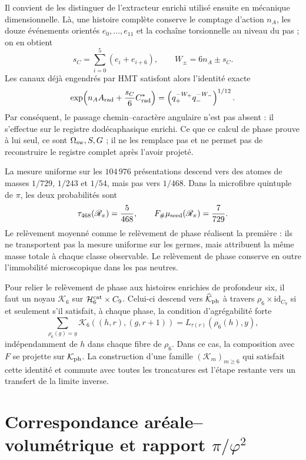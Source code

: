 Il convient de les distinguer de l'extracteur enrichi utilisé ensuite en
mécanique dimensionnelle. Là, une histoire complète conserve le comptage d'action
\(n_A\), les douze événements orientés \(e_0,\ldots,e_{11}\) et la cochaîne
torsionnelle au niveau du pas ; on en obtient
\[
 s_C=\sum_{i=0}^{5}(e_i+e_{i+6}),
 \qquad
 W_\pm=6n_A\pm s_C.
\]
Les canaux déjà engendrés par HMT satisfont alors l'identité exacte
\[
 \exp\!\left(n_AA_{\rm rad}+\frac{s_C}{6}C^\ast_{\rm rad}\right)
 =\left(q_+^{-W_+}q_-^{-W_-}\right)^{1/12}.
\]
Par conséquent, le passage chemin--caractère angulaire n'est pas absent : il s'effectue sur
le registre dodécaphasique enrichi. Ce que ce calcul de phase prouve à lui
seul, ce sont \(\Omega_{\rm sw},S,G\) ; il ne les remplace pas et ne permet pas de reconstruire le
registre complet après l'avoir projeté.

La mesure uniforme sur les \(104\,976\) présentations descend vers des atomes
de masses \(1/729\), \(1/243\) et \(1/54\), mais pas vers \(1/468\). Dans la
microfibre quintuple de \(\pi\), les deux probabilités sont
\[
 \tau_{468}(\mathscr R_\pi)=\frac5{468},
 \qquad
 F_\#\mu_{\rm seed}(\mathscr R_\pi)=\frac7{729}.
\]
Le relèvement moyenné comme le relèvement de phase réalisent la première : ils ne
transportent pas la mesure uniforme sur les germes, mais attribuent la même masse
totale à chaque classe observable. Le relèvement de phase conserve en outre
l'immobilité microscopique dans les pas neutres.

Pour relier le relèvement de phase aux histoires enrichies de
profondeur six, il faut un noyau \(\mathcal K_6\) sur
\(\mathcal H_6^{\rm cat}\times C_9\). Celui-ci descend vers
\(\widehat{\mathcal K}_{\rm ph}\) à travers
\(\rho_6\times\mathrm{id}_{C_9}\) si et seulement s'il satisfait, à chaque phase, la
condition d'agrégabilité forte
\[
 \sum_{\rho_6(g)=y}\mathcal K_6((h,r),(g,r+1))
 =L_{\tau(r)}(\rho_6(h),y),
\]
indépendamment de \(h\) dans chaque fibre de \(\rho_6\). Dans ce cas,
la composition avec \(F\) se projette sur \(\mathcal K_{\rm ph}\). La construction
d'une famille \((\mathcal K_m)_{m\geq6}\) qui satisfait cette identité et
commute avec toutes les troncatures est l'étape restante vers un
transfert de la limite inverse.


\section{Correspondance aréale–volumétrique et rapport $\pi /\varphi ^2$}
\label{p12-83-c16-s3:sec:bisagra-hojas-pi-phi2}

